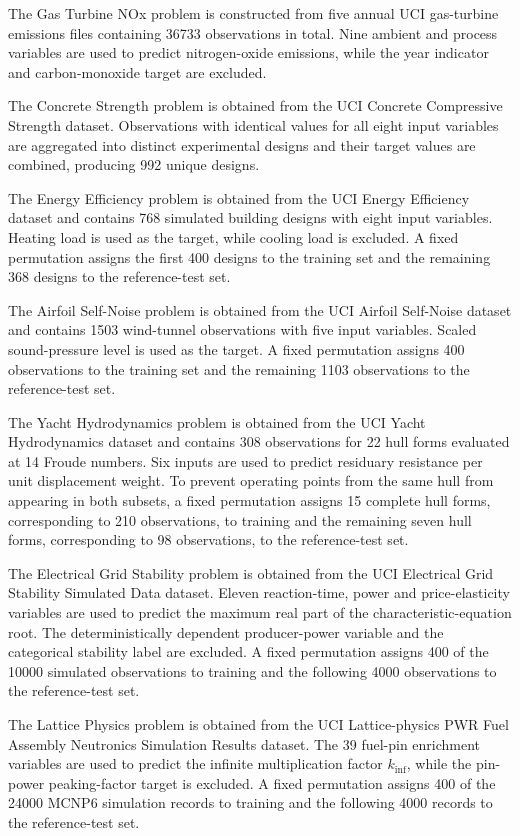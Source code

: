 \documentclass[12pt,oneside,bibtotoc,liststotoc]{scrbook}
\begin{document}
The Gas Turbine NOx problem is constructed from five annual UCI gas-turbine emissions files containing 36733 observations in total. Nine ambient and process variables are used to predict nitrogen-oxide emissions, while the year indicator and carbon-monoxide target are excluded.

The Concrete Strength problem is obtained from the UCI Concrete Compressive Strength dataset. Observations with identical values for all eight input variables are aggregated into distinct experimental designs and their target values are combined, producing 992 unique designs.

The Energy Efficiency problem is obtained from the UCI Energy Efficiency dataset and contains 768 simulated building designs with eight input variables. Heating load is used as the target, while cooling load is excluded. A fixed permutation assigns the first 400 designs to the training set and the remaining 368 designs to the reference-test set.

The Airfoil Self-Noise problem is obtained from the UCI Airfoil Self-Noise dataset and contains 1503 wind-tunnel observations with five input variables. Scaled sound-pressure level is used as the target. A fixed permutation assigns 400 observations to the training set and the remaining 1103 observations to the reference-test set.

The Yacht Hydrodynamics problem is obtained from the UCI Yacht Hydrodynamics dataset and contains 308 observations for 22 hull forms evaluated at 14 Froude numbers. Six inputs are used to predict residuary resistance per unit displacement weight. To prevent operating points from the same hull from appearing in both subsets, a fixed permutation assigns 15 complete hull forms, corresponding to 210 observations, to training and the remaining seven hull forms, corresponding to 98 observations, to the reference-test set.

The Electrical Grid Stability problem is obtained from the UCI Electrical Grid Stability Simulated Data dataset. Eleven reaction-time, power and price-elasticity variables are used to predict the maximum real part of the characteristic-equation root. The deterministically dependent producer-power variable and the categorical stability label are excluded. A fixed permutation assigns 400 of the 10000 simulated observations to training and the following 4000 observations to the reference-test set.

The Lattice Physics problem is obtained from the UCI Lattice-physics PWR Fuel Assembly Neutronics Simulation Results dataset. The 39 fuel-pin enrichment variables are used to predict the infinite multiplication factor $k_{\mathrm{inf}}$, while the pin-power peaking-factor target is excluded. A fixed permutation assigns 400 of the 24000 MCNP6 simulation records to training and the following 4000 records to the reference-test set.
\end{document}
